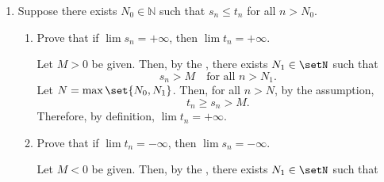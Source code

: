\begin{enumerate}
\begin{enumerate}
\begin{subprove}
        Let \(n > \max\set{N_1, N_2}\). Then, \(a \le s_n < a\)
        which is a contradiction. Therefore, \(\lim s_n \ge a\).
      \end{subprove}
      \item If all but finitely many \(s_n\) belong to \([a,b]\), 
      what can you conclude about \(\lim s_n\)? Justify your answer.\begin{subanswer}
        Conclusion: \(\lim s_n \in [a, b]\).
    
        Justification:
        Let \(s = \lim s_n\).
        The condition \(s_n \in [a, b]\) for all but finitely many \(n\) is equivalent to saying:
        \[
          s_n \ge a \quad\text{and}\quad s_n \le b \quad\text{for all but finitely many } n.
        \]
        Using the result proven in part (a):
        \begin{itemize}
          \item Since \(s_n \ge a\) eventually, it follows that \(s \ge a\).
          \item Similarly, since \(s_n \le b\) implies \(-s_n \ge -b\), applying the same logic shows \(-s \ge -b\), or \(s \le b\).
        \end{itemize}
        Combining these inequalities, we have \(a \le s \le b\). 
        Thus, the limit lies in the closed interval \([a, b]\).
      \end{subanswer}
    \end{enumerate}
  \item Suppose there exists \(N_0\in\mathbb{N}\) such that \(s_n\le t_n\) for all \(n>N_0\).
    \begin{enumerate}
      \item Prove that if \(\lim s_n=+\infty\), then \(\lim t_n=+\infty\).
      \begin{subprove}
        Let \(M > 0\) be given. Then, by the , 
        there exists \(N_1 \in \setN\) such that
        \[
          s_n > M \quad\text{for all } n > N_1.
        \]
        Let \(N = \max\set{N_0, N_1}\). Then, for all \(n > N\), by the assumption,
        \[
          t_n \ge s_n > M.
        \]
        Therefore, by definition, \(\lim t_n = +\infty\).
      \end{subprove}
      \newpage
      \item Prove that if \(\lim t_n=-\infty\), then \(\lim s_n=-\infty\).
      \begin{subprove}
        Let \(M < 0\) be given. Then, by the , 
        there exists \(N_1 \in \setN\) such that

\end{subprove}
\end{enumerate}
\end{enumerate}
